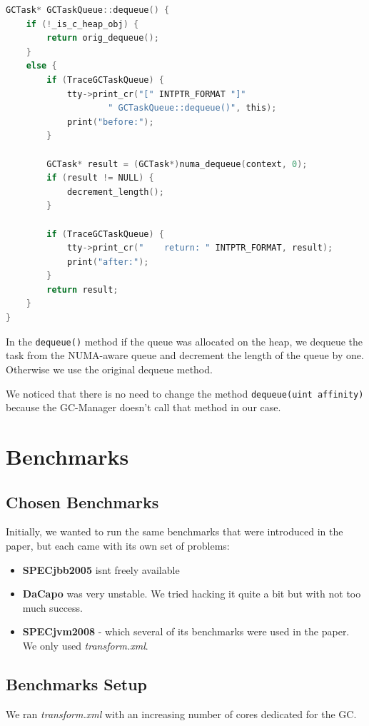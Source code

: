 \documentclass{article}
\begin{document}
 \begin{lstlisting}[language=C]
GCTask* GCTaskQueue::dequeue() {
    if (!_is_c_heap_obj) {
        return orig_dequeue();
    }
    else {
        if (TraceGCTaskQueue) {
            tty->print_cr("[" INTPTR_FORMAT "]"
                    " GCTaskQueue::dequeue()", this);
            print("before:");
        }

        GCTask* result = (GCTask*)numa_dequeue(context, 0);
        if (result != NULL) {
            decrement_length();
        }

        if (TraceGCTaskQueue) {
            tty->print_cr("    return: " INTPTR_FORMAT, result);
            print("after:");
        }
        return result;
    }
}
 \end{lstlisting}

 In the \lstinline{dequeue()} method if the queue was allocated on the heap, we dequeue the task from the NUMA-aware queue and decrement the length of the queue by one. Otherwise we use the original dequeue method.

 We noticed that there is no need to change the method \lstinline{dequeue(uint affinity)} because the GC-Manager doesn't call that method in our case.

 \newpage

 \section{Benchmarks}
 \subsection{Chosen Benchmarks}
 Initially, we wanted to run the same benchmarks that were introduced in the paper, but each came with its own set of problems:

 \begin{itemize}
   \item \textbf{SPECjbb2005} isnt freely available
   \item \textbf{DaCapo} was very unstable. We tried hacking it quite a bit but with not too much success.
   \item \textbf{SPECjvm2008} - which several of its benchmarks were used in the paper. We only used \textit{transform.xml}.
 \end{itemize}

 \subsection{Benchmarks Setup}
 We ran \textit{transform.xml} with an increasing number of cores dedicated for the GC.
\end{document}
